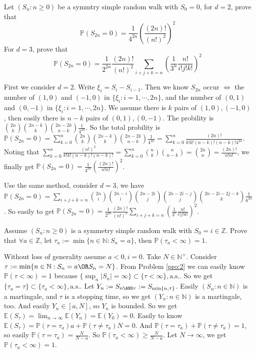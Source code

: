 \documentclass{ctexart}
\begin{document}
\begin{problem}\label{pro:3}
  Let \((S_n:n \geq 0)\) be a symmtry simple random walk with \(S_0=0\), for \(d=2\), prove that
  \[
    \mathbb{P}(S_{2n}=0)=\frac{1}{4^{2n}}\left(\frac{(2n)!}{(n!)^2}\right)^2
  \]
  For \(d=3\), prove that
  \[
    \mathbb{P}(S_{2n}=0)=\frac{1}{2^{2n}}\frac{(2n)!}{(n!)^2}\sum_{i + j + k = n} \left(\frac{1}{3^n}\frac{n!}{i!j!k!}\right)^2
  \]
\end{problem}
\begin{solution}
  First we consider \(d=2\). Write \(\xi_i=S_i-S_{i-1}\).
  Then we know \(S_{2n}\) occur \(\iff\) the number of \((1,0)\) and \((-1,0)\) in \(\{\xi_i:i=1,\cdots,2n\}\),
  and the number of \((0,1)\) and \((0,-1)\) in \(\{\xi_i:i=1,\cdots,2n\}\).
  We assume there is \(k\) pairs of \((1,0),(-1,0)\), then easily there is \(n-k\) pairs of \((0,1),(0,-1)\).
  The probility is \(\binom{2n}{k}\binom{2n-k}{k}\binom{2n-2k}{n-k}\frac{1}{4^{2n}}\).
  So the total probility is
  \(\mathbb{P}(S_{2n}=0)=\sum_{k=0}^{n}\binom{2n}{k}\binom{2n-k}{k}\binom{2n-2k}{n-k}\frac{1}{4^{2n}}=\sum_{k=0}^{n}\frac{(2n)!}{k!k!(n-k)!(n-k)!4^{2n}}\).
  Noting that \(\sum_{k=0}^{n}\frac{(n!)^2}{k!k!(n-k)!(n-k)!}=\sum_{k=0}^{n}\binom{n}{k}\binom{n}{n-k}=\binom{2n}{n}=\frac{(2n)!}{n!n!}\),
  we finally get \(\mathbb{P}(S_{2n}=0)=\frac{1}{4^{2n}}\left(\frac{(2n)!}{n!n!}\right)^2\).

  Use the same method, consider \(d=3\), we have
  \(\mathbb{P}(S_{2n}=0)=\sum_{i+j+k=n} \binom{2n}{i}\binom{2n-i}{i}\binom{2n-2i}{j}\binom{2n-2i-j}{j}\binom{2n-2i-2j-k}{k} \frac{1}{6^{2n}}\).
  So easily to get \(\mathbb{P}(S_{2n}=0)=\frac{1}{2^{2n}}\frac{(2n)!}{(n!)^2}\sum_{i + j + k = n} \left(\frac{1}{3^n}\frac{n!}{i!j!k!}\right)^2\).
\end{solution}

\begin{problem}\label{pro:4}
  Assume \((S_n:n \geq 0)\) is a symmetry simple random walk with \(S_0 = i \in \mathbb{Z}\).
  Prove that \(\forall a \in \mathbb{Z}\), let \(\tau_a:=\min\{n \in \mathbb{N}:S_n=a \}\), then \(\mathbb{P}(\tau_a < \infty) = 1 \).
\end{problem}
\begin{solution}
  Without loss of generality assume \(a<0,i=0\). Take \(N \in \mathbb{N}^+\). Consider \(\tau:=\min\{n \in \mathbb{N}:S_n=a \OR S_n=N\}\).
  From Problem \ref{pro:2} we can easily know \(\mathbb{P}(\tau < \infty)=1\) because \(\{\sup_n|S_n|=\infty\}\subset \{\tau<\infty\},\text{a.s.}\).
  So we get \(\{\tau_a = \tau\} \subset \{\tau_a<\infty\},\text{a.s.}\).
  Let \(Y_n:=S_{n \AND \tau}:=S_{\min\{n,\tau\}}\).
  Easily \((S_n:n \in \mathbb{N})\) is a martingale, and \(\tau\) is a stopping time, so we get
  \((Y_n:n \in \mathbb{N})\) is a martingale, too.
  And easily \(Y_n \in [a,N]\), so \(Y_n\) is bounded.
  So we get \(\mathbb{E}(S_{\tau})=\lim_{n \to \infty}\mathbb{E}(Y_n)=\mathbb{E}(Y_0)=0\).
  Easily to know \(\mathbb{E}(S_{\tau})=\mathbb{P}(\tau=\tau_a)a+\mathbb{P}(\tau \neq \tau_a)N=0\).
  And \(\mathbb{P}(\tau=\tau_a)+\mathbb{P}(\tau \neq \tau_a)=1\),
  so easily \(\mathbb{P}(\tau=\tau_a)=\frac{N}{N-a}\).
  So \(\mathbb{P}(\tau_a<\infty)\geq \frac{N}{N-a}\).
  Let \(N \to \infty\), we get \(\mathbb{P}(\tau_a<\infty)=1\).
\end{solution}
\end{document}
